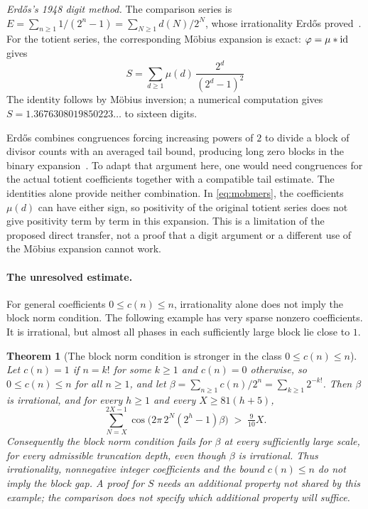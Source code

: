 \documentclass[11pt]{article}
\theoremstyle{plain}
\newtheorem{thm}{Theorem}[section]
\theoremstyle{definition}
\theoremstyle{remark}
\let\origmathrm\mathrm
\renewcommand{\mathrm}[1]{\ifmmode\origmathrm{#1}\else\textrm{#1}\fi}%
\begin{document}
\emph{Erd\H{o}s's 1948 digit method.} The comparison series is
$E=\sum_{n\ge1}1/(2^n-1)=\sum_{N\ge1}d(N)/2^N$, whose irrationality
Erd\H{o}s proved~\cite{erdos1948lambert}. For the totient series, the
corresponding M\"obius expansion is exact: $\varphi=\mu * \mathrm{id}$ gives
\begin{equation}\label{eq:mobmers}
  S=\sum_{d\ge 1}\mu(d)\,\frac{2^{d}}{(2^{d}-1)^{2}}
\end{equation}
The identity follows by M\"obius inversion; a numerical computation gives
$S=1.3676308019850223\ldots$ to sixteen digits.

Erd\H{o}s combines congruences forcing increasing powers of $2$ to divide
a block of divisor counts with an averaged tail bound, producing long
zero blocks in the binary expansion~\cite[pp.~63--66]{erdos1948lambert}.
To adapt that argument here, one would need congruences for the actual
totient coefficients together with a compatible tail estimate. The
identities alone provide neither combination. In \eqref{eq:mobmers},
the coefficients $\mu(d)$ can have either sign, so positivity of the
original totient series does not give positivity term by term in this
expansion. This is a limitation of the proposed direct transfer, not a
proof that a digit argument or a different use of the M\"obius expansion
cannot work.

\paragraph{The unresolved estimate.}
For general coefficients $0\le c(n)\le n$, irrationality alone does not
imply the block norm condition. The following example has very sparse
nonzero coefficients. It is irrational, but almost all phases in each
sufficiently large block lie close to $1$.

\begin{thm}[The block norm condition is stronger in the class $0\le c(n)\le n$]\label{thm:lacunary}
Let $c(n)=1$ if $n=k!$ for some $k\ge 1$ and $c(n)=0$ otherwise, so
$0\le c(n)\le n$ for all $n\ge 1$, and let $\beta=\sum_{n\ge1}c(n)/2^{n}
=\sum_{k\ge 1}2^{-k!}$. Then $\beta$ is irrational, and for every $h\ge 1$
and every $X\ge 81(h+5)$,
\[
  \sum_{N=X}^{2X-1}\cos\bigl(2\pi\,2^{N}(2^{h}-1)\beta\bigr) \;>\; \tfrac{9}{10}X .
\]
Consequently the block norm condition fails for $\beta$ at every
sufficiently large scale, for every admissible truncation depth, even though
$\beta$ is irrational. Thus irrationality, nonnegative integer coefficients
and the bound $c(n)\le n$ do not imply the block gap. A proof for $S$
needs an additional property not shared by this example; the comparison
does not specify which additional property will suffice.
\end{thm}
\end{document}
